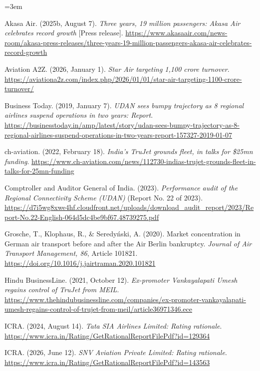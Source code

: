 \documentclass[12pt,a4paper]{article}
\newenvironment{o3box}{\ifthenelse{\boolean{o3highlight}}{\begingroup\color{o3sky}}{}}{\ifthenelse{\boolean{o3highlight}}{\endgroup}{}}
\begin{document}
\begin{o3box}
\begingroup\small{}\sloppy\emergencystretch=3em\def\UrlBreaks{\do\/\do\-\do\_\do\?\do\=\do\&\do\.\do\%}
\setlength{\parindent}{-0.5in}\setlength{\leftskip}{0.5in}\setlength{\parskip}{4pt}

Akasa Air. (2025b, August 7). \textit{Three years, 19 million passengers: Akasa Air celebrates record growth} [Press release]. \url{https://www.akasaair.com/news-room/akasa-press-releases/three-years-19-million-passengers-akasa-air-celebrates-record-growth}

Aviation A2Z. (2026, January 1). \textit{Star Air targeting 1,100 crore turnover}. \url{https://aviationa2z.com/index.php/2026/01/01/star-air-targeting-1100-crore-turnover/}

Business Today. (2019, January 7). \textit{UDAN sees bumpy trajectory as 8 regional airlines suspend operations in two years: Report}. \url{https://businesstoday.in/amp/latest/story/udan-sees-bumpy-trajectory-as-8-regional-airlines-suspend-operations-in-two-years-report-157327-2019-01-07}

ch-aviation. (2022, February 18). \textit{India's TruJet grounds fleet, in talks for \$25mn funding}. \url{https://www.ch-aviation.com/news/112730-indias-trujet-grounds-fleet-in-talks-for-25mn-funding}

Comptroller and Auditor General of India. (2023). \textit{Performance audit of the Regional Connectivity Scheme (UDAN)} (Report No. 22 of 2023). \url{https://d7i5wg8xwe4hf.cloudfront.net/uploads/download_audit_report/2023/Report-No.22-English-064d5dc4be9bf67.48739275.pdf}

Grosche, T., Klophaus, R., \& Seredy{\'n}ski, A. (2020). Market concentration in German air transport before and after the Air Berlin bankruptcy. \textit{Journal of Air Transport Management, 86}, Article 101821. \url{https://doi.org/10.1016/j.jairtraman.2020.101821}

Hindu BusinessLine. (2021, October 12). \textit{Ex-promoter Vankayalapati Umesh regains control of TruJet from MEIL}. \url{https://www.thehindubusinessline.com/companies/ex-promoter-vankayalapati-umesh-regains-control-of-trujet-from-meil/article36971346.ece}

ICRA. (2024, August 14). \textit{Tata SIA Airlines Limited: Rating rationale}. \url{https://www.icra.in/Rating/GetRationalReportFilePdf?id=129364}

ICRA. (2026, June 12). \textit{SNV Aviation Private Limited: Rating rationale}. \url{https://www.icra.in/Rating/GetRationalReportFilePdf?id=143563}


\end{o3box}
\end{document}
